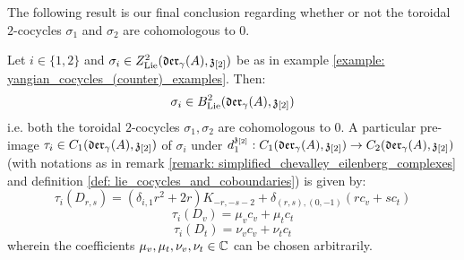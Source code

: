         The following result is our final conclusion regarding whether or not the toroidal $2$-cocycles $\sigma_1$ and $\sigma_2$ are cohomologous to $0$.
        \begin{theorem} \label{theorem: non_trivial_yangian_cocycles_examples}
            Let $i \in \{1, 2\}$ and $\sigma_i \in Z^2_{\mathrm{Lie}}(\mathfrak{der}_{\gamma}(A), \mathfrak{z}_{[2]})$ be as in example \ref{example: yangian_cocycles_(counter)_examples}. Then:
                $$\sigma_i \in B^2_{\mathrm{Lie}}(\mathfrak{der}_{\gamma}(A), \mathfrak{z}_{[2]})$$
            i.e. both the toroidal $2$-cocycles $\sigma_1, \sigma_2$ are cohomologous to $0$. A particular pre-image $\tau_i \in C_1(\mathfrak{der}_{\gamma}(A), \mathfrak{z}_{[2]})$ of $\sigma_i$ under $d_1^{\mathfrak{z}_{[2]}}: C_1(\mathfrak{der}_{\gamma}(A), \mathfrak{z}_{[2]}) \to C_2(\mathfrak{der}_{\gamma}(A), \mathfrak{z}_{[2]})$ (with notations as in remark \ref{remark: simplified_chevalley_eilenberg_complexes} and definition \ref{def: lie_cocycles_and_coboundaries}) is given by:
                $$\tau_i(D_{r, s}) = ( \delta_{i, 1} r^2 + 2r ) K_{-r, -s - 2} + \delta_{(r, s), (0, -1)} ( r c_v + s c_t )$$
                $$\tau_i(D_v) = \mu_v c_v + \mu_t c_t$$
                $$\tau_i(D_t) = \nu_v c_v + \nu_t c_t$$
            wherein the coefficients $\mu_v, \mu_t, \nu_v, \nu_t \in \mathbb{C}$ can be chosen arbitrarily.
        \end{theorem}
